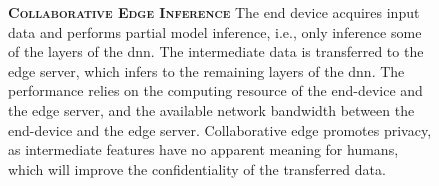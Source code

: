 \begin{figure}
	\begin{minipage}{0.65\linewidth}
		\textbf{\protect{} \textsc{Collaborative Edge Inference}}
		\color{caption-color} \newline
		The end device acquires input data and performs partial model inference, i.e., only inference some of the layers of the \gls{dnn}. The intermediate data is transferred to the edge server, which infers to the remaining layers of the \gls{dnn}. The performance relies on the computing resource of the end-device and the edge server, and the available network bandwidth between the end-device and the edge server. Collaborative edge promotes privacy, as intermediate features have no apparent meaning for humans, which will improve the confidentiality of the transferred data.   
	\end{minipage}%
	\hfill
	\begin{minipage}{0.3\linewidth}
		\centering
		\captionsetup[subfigure]{justification=centering}
		\begin{figure}
			\centering

\end{figure}
\end{minipage}
\end{figure}
